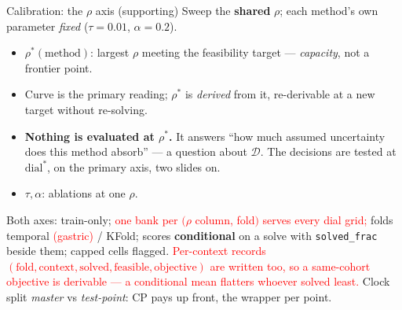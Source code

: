 \documentclass{beamer}
\newcommand{\mc}[1]{\textcolor{red}{#1}}
\begin{document}
\begin{frame}{Calibration: the $\rho$ axis (supporting)}
  Sweep the \textbf{shared} $\rho$; each method's own parameter \emph{fixed}
  ($\tau{=}0.01$, $\alpha{=}0.2$).
  \begin{itemize}
    \item $\rho^\ast(\text{method})$: largest $\rho$ meeting the feasibility target
      --- \emph{capacity}, not a frontier point.
    \item Curve is the primary reading; $\rho^\ast$ is \emph{derived} from it,
      re-derivable at a new target without re-solving.
    \item \textbf{Nothing is evaluated at $\rho^\ast$.} It answers ``how much
      assumed uncertainty does this method absorb'' --- a question about
      $\mathcal D$. The decisions are tested at $\text{dial}^\ast$, on the primary
      axis, two slides on.
    \item $\tau,\alpha$: ablations at one $\rho$.
  \end{itemize}
  Both axes: train-only; \mc{one bank per $(\rho$ column, fold$)$ serves every
  dial grid;} folds temporal \mc{(gastric)} / KFold; scores
  \textbf{conditional} on a solve with \texttt{solved\_frac} beside them; capped
  cells flagged. \mc{Per-context records $(\text{fold},\text{context},\text{solved},
  \text{feasible},\text{objective})$ are written too, so a same-cohort objective is
  derivable --- a conditional mean flatters whoever solved least.} Clock split
  \emph{master} vs \emph{test-point}: CP pays up front, the wrapper per point.
\end{frame}
\end{document}
